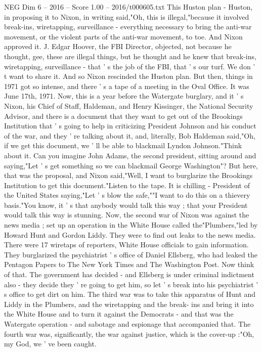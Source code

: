 \begin{textsample}{NEG Dim 6 – 2016 – Score 1.00 – 2016/t000605.txt}
This Huston plan - Huston, in proposing it to Nixon, in writing said,"Oh, this is illegal,"because it involved break-ins, wiretapping, surveillance - everything necessary to bring the anti-war movement, or the violent parts of the anti-war movement, to toe.
And Nixon approved it.
J.
Edgar Hoover, the FBI Director, objected, not because he thought, gee, these are illegal things, but he thought and he knew that break-ins, wiretapping, surveillance - that ' s the job of the FBI, that ' s our turf.
We don ' t want to share it.
And so Nixon rescinded the Huston plan.
But then, things in 1971 got so intense, and there ' s a tape of a meeting in the Oval Office.
It was June 17th, 1971.
Now, this is a year before the Watergate burglary, and it ' s Nixon, his Chief of Staff, Haldeman, and Henry Kissinger, the National Security Advisor, and there is a document that they want to get out of the Brookings Institution that ' s going to help in criticizing President Johnson and his conduct of the war, and they ' re talking about it, and, literally, Bob Haldeman said,"Oh, if we get this document, we ' ll be able to blackmail Lyndon Johnson."Think about it.
Can you imagine John Adams, the second president, sitting around and saying,"Let ' s get something so we can blackmail George Washington"?
But here, that was the proposal, and Nixon said,"Well, I want to burglarize the Brookings Institution to get this document."Listen to the tape.
It is chilling - President of the United States saying,"Let ' s blow the safe,""I want to do this on a thievery basis."You know, it ' s that anybody would talk this way ; that your President would talk this way is stunning.
Now, the second war of Nixon was against the news media ; set up an operation in the White House called the"Plumbers,"led by Howard Hunt and Gordon Liddy.
They were to find out leaks to the news media.
There were 17 wiretaps of reporters, White House officials to gain information.
They burglarized the psychiatrist ' s office of Daniel Ellsberg, who had leaked the Pentagon Papers to The New York Times and The Washington Post.
Now think of that.
The government has decided - and Ellsberg is under criminal indictment also - they decide they ' re going to get him, so let ' s break into his psychiatrist ' s office to get dirt on him.
The third war was to take this apparatus of Hunt and Liddy in the Plumbers, and the wiretapping and the break- ins and bring it into the White House and to turn it against the Democrats - and that was the Watergate operation - and sabotage and espionage that accompanied that.
The fourth war was, significantly, the war against justice, which is the cover-up :"Oh, my God, we ' ve been caught.

\end{textsample}
